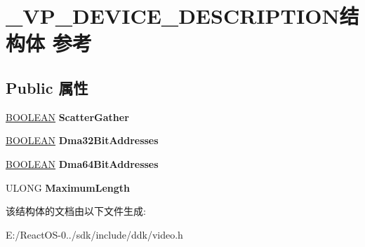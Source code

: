 \hypertarget{struct___v_p___d_e_v_i_c_e___d_e_s_c_r_i_p_t_i_o_n}{}\section{\+\_\+\+V\+P\+\_\+\+D\+E\+V\+I\+C\+E\+\_\+\+D\+E\+S\+C\+R\+I\+P\+T\+I\+O\+N结构体 参考}
\label{struct___v_p___d_e_v_i_c_e___d_e_s_c_r_i_p_t_i_o_n}
\subsection*{Public 属性}
\begin{DoxyCompactItemize}
\item 
\mbox{\label{struct___v_p___d_e_v_i_c_e___d_e_s_c_r_i_p_t_i_o_n_a8160d3868195ff858077af6642988c04}} 
\hyperlink{_processor_bind_8h_a112e3146cb38b6ee95e64d85842e380a}{B\+O\+O\+L\+E\+AN} {\bfseries Scatter\+Gather}
\item 
\mbox{\label{struct___v_p___d_e_v_i_c_e___d_e_s_c_r_i_p_t_i_o_n_ad2e149aa01d26e7b203d4758fa3cb1b9}} 
\hyperlink{_processor_bind_8h_a112e3146cb38b6ee95e64d85842e380a}{B\+O\+O\+L\+E\+AN} {\bfseries Dma32\+Bit\+Addresses}
\item 
\mbox{\label{struct___v_p___d_e_v_i_c_e___d_e_s_c_r_i_p_t_i_o_n_a489110d00e72c44bd0f990b95b273d4f}} 
\hyperlink{_processor_bind_8h_a112e3146cb38b6ee95e64d85842e380a}{B\+O\+O\+L\+E\+AN} {\bfseries Dma64\+Bit\+Addresses}
\item 
\mbox{\label{struct___v_p___d_e_v_i_c_e___d_e_s_c_r_i_p_t_i_o_n_a65c772ccfd21bacdaee9561a1e2ab4b0}} 
U\+L\+O\+NG {\bfseries Maximum\+Length}
\end{DoxyCompactItemize}


该结构体的文档由以下文件生成\+:\begin{DoxyCompactItemize}
\item 
E\+:/\+React\+O\+S-\/0../sdk/include/ddk/video.\+h\end{DoxyCompactItemize}
